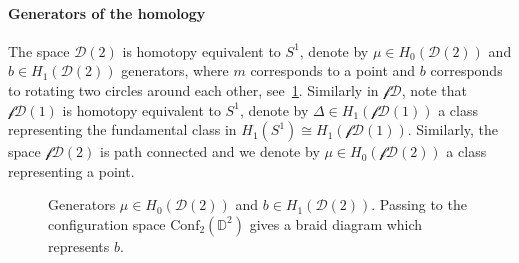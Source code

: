 \documentclass{scrartcl}
\theoremstyle{plain}
\theoremstyle{definition}
\begin{document}
\paragraph{Generators of the homology} The space $\mathcal D(2)$ is homotopy equivalent to $S^1$, denote by $\mu\in H_0(\mathcal D(2))$ and $b\in H_1(\mathcal D(2))$ generators, where $m$ corresponds to a point and $b$ corresponds to rotating two circles around each other, see~\ref{gerstenhaber-generator}. Similarly in $\mathcal{fD}$, note that $\mathcal {fD}(1)$ is homotopy equivalent to $S^1$, denote by $\Delta\in H_1(\mathcal{fD}(1))$ a class representing the fundamental class in $H_1(S^1) \cong H_1(\mathcal{fD}(1))$. Similarly, the space $\mathcal{fD}(2)$ is path connected and we denote by $\mu\in H_0(\mathcal{fD}(2))$ a class representing a point.

\begin{figure}[ht]
    \centering
    
    \hfill
    
    \caption{Generators $\mu \in H_0(\mathcal D(2))$ and $b\in H_1(\mathcal D(2))$. Passing to the configuration space $\mathrm{Conf}_2(\mathds{D}^2)$ gives a braid diagram which represents $b$.}\label{gerstenhaber-generator}
\end{figure}
\end{document}
